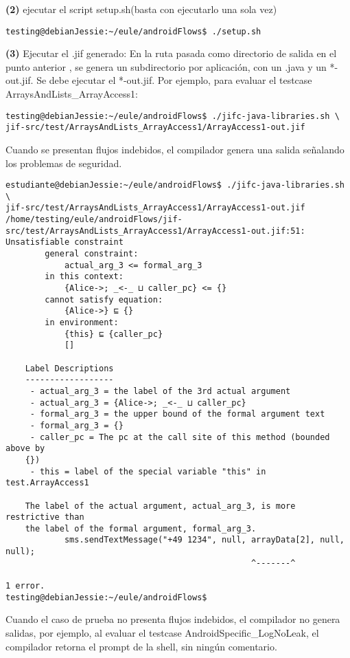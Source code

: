 \textbf{(2)} ejecutar el script setup.sh(basta con ejecutarlo una sola vez)
\begin{lstlisting}
testing@debianJessie:~/eule/androidFlows$ ./setup.sh
\end{lstlisting}

\textbf{(3)} 
Ejecutar el .jif generado:\newline
En la ruta pasada como directorio de salida en el punto anterior
{\small{}}, se genera un subdirectorio por
aplicación, con un .java y un *-out.jif. Se debe ejecutar el *-out.jif. Por
ejemplo, para evaluar el testcase ArraysAndLists\_ArrayAccess1:
\begin{lstlisting}
testing@debianJessie:~/eule/androidFlows$ ./jifc-java-libraries.sh \
jif-src/test/ArraysAndLists_ArrayAccess1/ArrayAccess1-out.jif
\end{lstlisting}
Cuando se presentan flujos indebidos, el compilador genera una salida señalando
los problemas de seguridad.
\lstset{
    language=bash,
    basicstyle=\tiny,
  }
\begin{lstlisting}
estudiante@debianJessie:~/eule/androidFlows$ ./jifc-java-libraries.sh \
jif-src/test/ArraysAndLists_ArrayAccess1/ArrayAccess1-out.jif 
/home/testing/eule/androidFlows/jif-src/test/ArraysAndLists_ArrayAccess1/ArrayAccess1-out.jif:51:
Unsatisfiable constraint
    	general constraint:
    		actual_arg_3 <= formal_arg_3
    	in this context:
    		{Alice->; _<-_ ⊔ caller_pc} <= {}
    	cannot satisfy equation:
    		{Alice->} ⊑ {}
    	in environment:
    		{this} ⊑ {caller_pc}
    		[]

    Label Descriptions
    ------------------
     - actual_arg_3 = the label of the 3rd actual argument
     - actual_arg_3 = {Alice->; _<-_ ⊔ caller_pc}
     - formal_arg_3 = the upper bound of the formal argument text
     - formal_arg_3 = {}
     - caller_pc = The pc at the call site of this method (bounded above by 
    {})
     - this = label of the special variable "this" in test.ArrayAccess1

    The label of the actual argument, actual_arg_3, is more restrictive than 
    the label of the formal argument, formal_arg_3.
            sms.sendTextMessage("+49 1234", null, arrayData[2], null, null);
                                                  ^-------^

1 error.
testing@debianJessie:~/eule/androidFlows$
\end{lstlisting}

Cuando el caso de prueba no presenta flujos indebidos, el compilador no genera
salidas, por ejemplo, al evaluar el testcase AndroidSpecific\_LogNoLeak, el
compilador retorna el prompt de la shell, sin ningún comentario.


